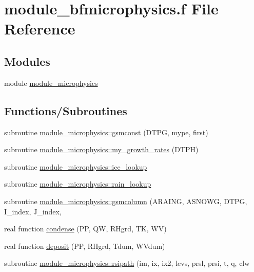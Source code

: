 \hypertarget{module__bfmicrophysics_8f}{}\section{module\+\_\+bfmicrophysics.\+f File Reference}
\label{module__bfmicrophysics_8f}
\subsection*{Modules}
\begin{DoxyCompactItemize}
\item 
module \hyperlink{namespacemodule__microphysics}{module\+\_\+microphysics}
\end{DoxyCompactItemize}
\subsection*{Functions/\+Subroutines}
\begin{DoxyCompactItemize}
\item 
subroutine \hyperlink{namespacemodule__microphysics_ad5f89457c2cd2ba431b1c60d5ecbecc4}{module\+\_\+microphysics\+::gsmconst} (D\+T\+PG, mype, first)
\item 
subroutine \hyperlink{namespacemodule__microphysics_aa41d6b0b3b4eca4b41999d6c6aadb317}{module\+\_\+microphysics\+::my\+\_\+growth\+\_\+rates} (D\+T\+PH)
\item 
subroutine \hyperlink{namespacemodule__microphysics_a9273c6542f2e983e0f9040c80907b3c6}{module\+\_\+microphysics\+::ice\+\_\+lookup}
\item 
subroutine \hyperlink{namespacemodule__microphysics_a0090b42e85bd381e5459a9e8db9dc120}{module\+\_\+microphysics\+::rain\+\_\+lookup}
\item 
subroutine \hyperlink{namespacemodule__microphysics_a7a0b4005a965eda2890022b02f807bb7}{module\+\_\+microphysics\+::gsmcolumn} (A\+R\+A\+I\+NG, A\+S\+N\+O\+WG, D\+T\+PG, I\+\_\+index, J\+\_\+index,    
\item 
real function \hyperlink{module__bfmicrophysics_8f_ac3e5788798119e5db1749932012a1096}{condense} (PP, QW, R\+Hgrd, TK, WV)
\item 
real function \hyperlink{module__bfmicrophysics_8f_a3c00353fd3ab0fba51a524a05a5fc640}{deposit} (PP, R\+Hgrd, Tdum, W\+Vdum)
\item 
subroutine \hyperlink{namespacemodule__microphysics_a9cf7964ff1097213773b2b91e13d18d0}{module\+\_\+microphysics\+::rsipath} (im, ix, ix2, levs, prsl, prsi, t, q, clw          
\end{DoxyCompactItemize}
